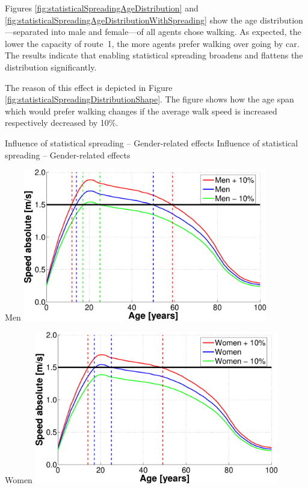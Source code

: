 {}

Figures \ref{fig:statisticalSpreadingAgeDistribution} and \ref{fig:statisticalSpreadingAgeDistributionWithSpreading} show the age distribution---separated into male and female---of all agents chose walking. As expected, the lower the capacity of route~1, the more agents prefer walking over going by car. The results indicate that enabling statistical spreading broadens and flattens the distribution significantly. 

The reason of this effect is depicted in Figure \ref{fig:statisticalSpreadingDistributionShape}. The figure shows how the age span which would prefer walking changes if the average walk speed is increased respectively decreased by 10\%.

\createfigure%
{Influence of statistical spreading -- Gender-related effects}%
{Influence of statistical spreading -- Gender-related effects}%
{\label{fig:statisticalSpreadingDistributionShape}}%
{%
  \createsubfigure%
  {Men}%
  {\includegraphics[width=0.80\textwidth, angle=0]{extending/figures/MultiModalSimulation/pedestrianSpeedVariationMen}}%
  {\label{fig:walkingPeople1.5}}%
  {\vspace{7.5mm}}%

  \createsubfigure%
  {Women}%
  {\includegraphics[width=0.80\textwidth, angle=0]{extending/figures/MultiModalSimulation/pedestrianSpeedVariationWomen}}%
  {\label{fig:walkingPeople1.0}}%
  {}%
}%
{}

